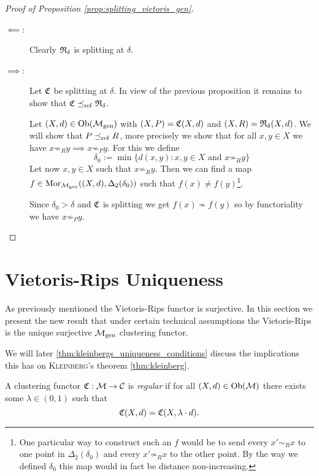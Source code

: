 \begin{proof}[Proof of Proposition \ref{prop:splitting_vietoris_gen}]
    \begin{description}
        \item[$\impliedby$:] Clearly $\mathfrak{R}_\delta$ is splitting at $\delta$.
        \item[$\implies$:] Let $\mathfrak{C}$ be splitting at $\delta$. In view of the previous proposition it remains to show that $\mathfrak{C} \preceq_\mathrm{ref} \mathfrak{R}_\delta$.
        
        Let $(X,d) \in \mathrm {Ob}({\mathcal{M}_\mathrm{gen}})$ with $(X,P) = \mathfrak{C}(X,d)$ and $(X,R) = \mathfrak{R}_\delta(X,d)$. We will show that $P \preceq_\mathrm{ref} R$, more precisely we show that for all $x,y \in X$ we have $x \not\sim_R y \implies x \not\sim_P y$. For this we define
        $$
        \delta_0 := \min\{d(x,y): x,y \in X \text{ and } x \not\sim_R y\}
        $$
        Let now $x,y \in X$ such that $x \not\sim_R y$.
        Then we can find a map $f \in \mathrm {Mor}_{\mathcal{M}_\mathrm{gen}}((X,d), \Delta_2(\delta_0))$ such that $f(x) \neq f(y)$\footnote{One particular way to construct such an $f$ would be to send every $x' \sim_R x$ to one point in $\Delta_2(\delta_0)$ and every $x' \not\sim_R x$ to the other point. By the way we defined $\delta_0$ this map would in fact be distance non-increasing.}.

        Since $\delta_0 > \delta$ and $\mathfrak{C}$ is splitting we get $f(x) \not\sim f(y)$ so by functoriality we have $x \not\sim_P y$.
    \end{description}
\end{proof}

\section[Vietoris-Rips Uniqueness]{Vietoris-Rips Uniqueness \newresult[]}

As previously mentioned the Vietoris-Rips functor is surjective.
In this section we present the new result that under certain technical assumptions the Vietoris-Rips is the unique surjective ${\mathcal{M}_\mathrm{gen}}$ clustering functor.

We will later  \ref{thm:kleinbergs_uniqueness_conditions} discuss the implications this has on \textsc{Kleinberg}'s theorem \ref{thm:kleinberg}. 

\begin{definition}{}{}
    A clustering functor $\mathfrak{C}: \mathcal{M} \to \mathcal{C}$ is \emph{regular} if for all $(X,d) \in \mathrm {Ob}(\mathcal{M})$ there exists some $\lambda \in (0, 1)$ such that
    $$
    \mathfrak{C}(X,d) = \mathfrak{C}(X, \lambda \cdot d).
    $$
    
\end{definition}

